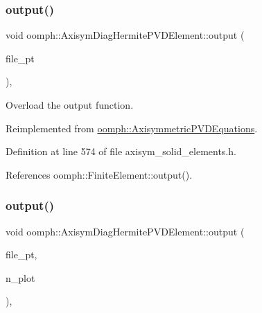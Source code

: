 \subsubsection{\texorpdfstring{output()}{output()}\hspace{0.1cm}{\footnotesize\ttfamily [3/4]}}
{\footnotesize\ttfamily void oomph\+::\+Axisym\+Diag\+Hermite\+P\+V\+D\+Element\+::output (\begin{DoxyParamCaption}\item[{F\+I\+LE $\ast$}]{file\+\_\+pt }\end{DoxyParamCaption})\hspace{0.3cm}{\ttfamily [inline]}, {\ttfamily [virtual]}}



Overload the output function. 



Reimplemented from \hyperlink{classoomph_1_1AxisymmetricPVDEquations_a3b271e966cc554c21231503f7a965549}{oomph\+::\+Axisymmetric\+P\+V\+D\+Equations}.



Definition at line 574 of file axisym\+\_\+solid\+\_\+elements.\+h.



References oomph\+::\+Finite\+Element\+::output().

\mbox{\label{classoomph_1_1AxisymDiagHermitePVDElement_adb95d8bc9f3177ae6c49f62fe48a1902}} 
\subsubsection{\texorpdfstring{output()}{output()}\hspace{0.1cm}{\footnotesize\ttfamily [4/4]}}
{\footnotesize\ttfamily void oomph\+::\+Axisym\+Diag\+Hermite\+P\+V\+D\+Element\+::output (\begin{DoxyParamCaption}\item[{F\+I\+LE $\ast$}]{file\+\_\+pt,  }\item[{const unsigned \&}]{n\+\_\+plot }\end{DoxyParamCaption})\hspace{0.3cm}{\ttfamily [inline]}, {\ttfamily [virtual]}}



